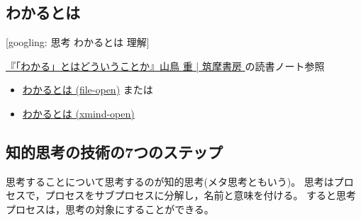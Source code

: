\documentclass[dvipdfmx,11pat]{jarticle}
\begin{document}
\subsection{わかるとは}
\label{sec:orga7ba00e}

{[}googling: 思考 わかるとは 理解]

\href{https://www.chikumashobo.co.jp/product/9784480059390/}{『「わかる」とはどういうことか』山鳥 重 | 筑摩書房 }
の読書ノート参照
\begin{itemize}
\item \href{../Maps/わかるとは.xmind}{わかるとは (file-open)} または
\item \href{shell:xmind ../Maps/わかるとは.xmind}{わかるとは (xmind-open)}
\end{itemize}
\subsection{知的思考の技術の7つのステップ}
\label{sec:org979dfa2}

思考することについて思考するのが知的思考(メタ思考ともいう)。
思考はプロセスで，プロセスをサブプロセスに分解し，名前と意味を付ける。
すると思考プロセスは，思考の対象にすることができる。
\end{document}
